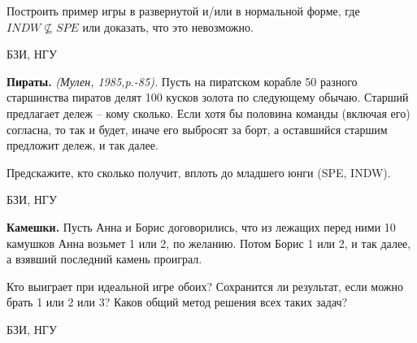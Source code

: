 \begin{problem}
{\rm
Построить пример игры в развернутой и/или в нормальной
форме, где $INDW \not\subseteq SPE$ или доказать, что это
невозможно. }



\begin{sol}

\end{sol}
\end{problem}


\begin{source}
БЗИ, НГУ
\end{source}




\begin{problem}
{\bf Пираты.} {\em (Мулен, 1985,p.-85).} Пусть на пиратском
корабле 50 разного старшинства пиратов делят 100 кусков
золота по следующему обычаю. Старший предлагает дележ --
кому сколько. Если хотя бы половина команды (включая его)
согласна, то так и будет, иначе его выбросят за борт, а
оставшийся старшим предложит дележ, и так далее.

Предскажите, кто сколько получит, вплоть до младшего юнги
(SPE, INDW).



\begin{sol}

\end{sol}
\end{problem}


\begin{source}
БЗИ, НГУ
\end{source}



\begin{problem}
{\bf Камешки.} {\em } Пусть Анна и Борис договорились, что
из лежащих перед ними 10 камушков Анна возьмет 1 или 2, по
желанию. Потом Борис 1 или 2, и так далее, а взявший
последний камень проиграл.

Кто выиграет при идеальной игре обоих? Сохранится ли
результат, если можно брать 1 или 2 или 3? Каков общий
метод решения всех таких задач?



\begin{sol}

\end{sol}
\end{problem}


\begin{source}
БЗИ, НГУ
\end{source}




